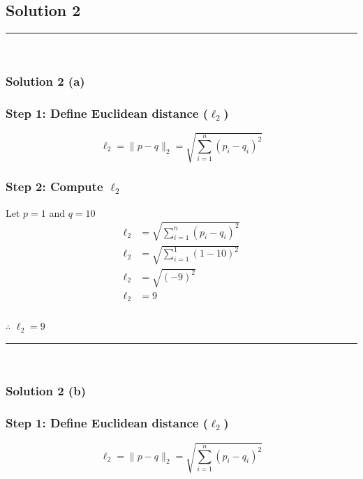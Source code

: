 \documentclass{article}
\begin{document}
\subsection*{Solution 2}
\noindent\rule{\textwidth}{0.4pt}\\
\subsubsection*{Solution 2 (a)}
\subsubsection*{Step 1: Define Euclidean distance ($\ell_2$)}
\parbox{\textwidth}{

$$\ell_2 = \|p - q\|_2 = \sqrt{\sum_{i=1}^{n} (p_i - q_i)^2}$$

}

\subsubsection*{Step 2: Compute $\ell_2$}
\parbox{\textwidth}{
Let $p=1$ and $q=10$
$$
\begin{aligned}
\ell_2 &= \sqrt{\sum_{i=1}^{n} (p_i - q_i)^2}\\
\ell_2 &= \sqrt{\sum_{i=1}^{1} (1 - 10)^2}\\
\ell_2 &= \sqrt{(- 9)^2}\\
\ell_2 &= 9
\end{aligned}
$$
}
\subsubsection*{\normalfont}{$\therefore$ $\ell_{2} = 9$}

\noindent\rule{\textwidth}{0.4pt}\\

\subsubsection*{Solution 2 (b)}
\subsubsection*{Step 1: Define Euclidean distance ($\ell_2$)}
\parbox{\textwidth}{

$$\ell_2 = \|p - q\|_2 = \sqrt{\sum_{i=1}^{n} (p_i - q_i)^2}$$

}
\end{document}
